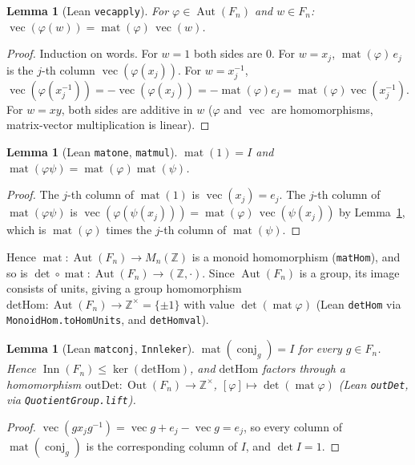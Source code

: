 \documentclass[11pt]{article}
\newtheorem{lemma}[theorem]{Lemma}
\theoremstyle{definition}
\theoremstyle{remark}
\renewcommand{\_}{\oldus\allowbreak}
\newcommand{\Z}{\mathbb{Z}}
\newcommand{\Aut}{\operatorname{Aut}}
\newcommand{\Out}{\operatorname{Out}}
\newcommand{\Inn}{\operatorname{Inn}}
\newcommand{\vect}{\operatorname{vec}}
\newcommand{\mat}{\operatorname{mat}}
\newcommand{\conj}{\operatorname{conj}}
\begin{document}
\begin{lemma}[Lean \texttt{vec\_apply}]\label{lem:vec}
For $\varphi\in\Aut(F_n)$ and $w\in F_n$: $\vect(\varphi(w))=\mat(\varphi)\,\vect(w)$.
\end{lemma}
\begin{proof}
Induction on words. For $w=1$ both sides are $0$. For $w=x_j$, $\mat(\varphi)\,e_j$ is the $j$-th column
$\vect(\varphi(x_j))$. For $w=x_j^{-1}$, $\vect(\varphi(x_j^{-1}))=-\vect(\varphi(x_j))=-\mat(\varphi)e_j
=\mat(\varphi)\vect(x_j^{-1})$. For $w=xy$, both sides are additive in $w$ ($\varphi$ and $\vect$ are
homomorphisms, matrix-vector multiplication is linear).
\end{proof}

\begin{lemma}[Lean \texttt{mat\_one}, \texttt{mat\_mul}]\label{lem:mul}
$\mat(1)=I$ and $\mat(\varphi\psi)=\mat(\varphi)\mat(\psi)$.
\end{lemma}
\begin{proof}
The $j$-th column of $\mat(1)$ is $\vect(x_j)=e_j$. The $j$-th column of $\mat(\varphi\psi)$ is
$\vect(\varphi(\psi(x_j)))=\mat(\varphi)\,\vect(\psi(x_j))$ by Lemma~\ref{lem:vec}, which is
$\mat(\varphi)$ times the $j$-th column of $\mat(\psi)$.
\end{proof}

Hence $\mat:\Aut(F_n)\to M_n(\Z)$ is a monoid homomorphism (\texttt{matHom}), and so is
$\det\circ\mat:\Aut(F_n)\to(\Z,\cdot)$. Since $\Aut(F_n)$ is a group, its image consists of units, giving a
group homomorphism $\mathrm{detHom}:\Aut(F_n)\to\Z^\times=\{\pm1\}$ with value $\det(\mat\varphi)$ (Lean
\texttt{detHom} via \texttt{MonoidHom.toHomUnits}, and \texttt{detHom\_val}).

\begin{lemma}[Lean \texttt{mat\_conj}, \texttt{Inn\_le\_ker}]\label{lem:conj}
$\mat(\conj_g)=I$ for every $g\in F_n$. Hence $\Inn(F_n)\le\ker(\mathrm{detHom})$, and $\mathrm{detHom}$
factors through a homomorphism $\mathrm{outDet}:\Out(F_n)\to\Z^\times$, $[\varphi]\mapsto\det(\mat\varphi)$
(Lean \texttt{outDet}, via \texttt{QuotientGroup.lift}).
\end{lemma}
\begin{proof}
$\vect(g x_j g^{-1})=\vect g+e_j-\vect g=e_j$, so every column of $\mat(\conj_g)$ is the corresponding
column of $I$, and $\det I=1$.
\end{proof}
\end{document}
